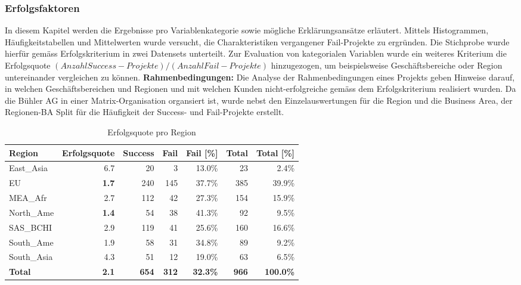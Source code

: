 \subsubsection{Erfolgsfaktoren}
In diesem Kapitel werden die Ergebnisse pro Variablenkategorie sowie mögliche Erklärungsansätze erläutert. Mittels Histogrammen, Häufigkeitstabellen und Mittelwerten wurde versucht, die Charakteristiken vergangener Fail-Projekte zu ergründen. Die Stichprobe wurde hierfür gemäss Erfolgskriterium in zwei Datensets unterteilt. Zur Evaluation von kategorialen Variablen wurde ein weiteres Kriterium die Erfolgsquote $(Anzahl Success-Projekte) / (Anzahl Fail-Projekte)$ hinzugezogen, um beispielsweise Geschäftsbereiche oder Region untereinander vergleichen zu können.
\newline\newline\textbf{Rahmenbedingungen:} Die Analyse der Rahmenbedingungen eines Projekts geben Hinweise darauf, in welchen Geschäftsbereichen und Regionen und mit welchen Kunden nicht-erfolgreiche gemäss dem Erfolgskriterium realisiert wurden. Da die Bühler AG in einer Matrix-Organisation organsiert ist, wurde nebst den Einzelauswertungen für die Region und die Business Area, der Regionen-BA Split für die Häufigkeit der Success- und Fail-Projekte erstellt.
\begin{table}[H]
	\centering
	\caption{Erfolgsquote pro Region}
	\begin{tabular}{lrrrrrr}
		\textbf{Region} & \multicolumn{1}{l}{\textbf{Erfolgsquote}} & \multicolumn{1}{l}{\textbf{Success}} & \multicolumn{1}{l}{\textbf{Fail}} & \multicolumn{1}{l}{\textbf{Fail [\%]}} & \multicolumn{1}{l}{\textbf{Total}} & \multicolumn{1}{l}{\textbf{Total [\%]}} \\ \hline
		East\_Asia & 6.7   & 20    & 3     & 13.0\% & 23    & 2.4\% \\
		EU    & \textbf{1.7}   & 240   & 145   & 37.7\% & 385   & 39.9\% \\
		MEA\_Afr & 2.7   & 112   & 42    & 27.3\% & 154   & 15.9\% \\
		North\_Ame & \textbf{1.4}   & 54    & 38    & 41.3\% & 92    & 9.5\% \\
		SAS\_BCHI & 2.9   & 119   & 41    & 25.6\% & 160   & 16.6\% \\
		South\_Ame & 1.9   & 58    & 31    & 34.8\% & 89    & 9.2\% \\
		South\_Asia & 4.3   & 51    & 12    & 19.0\% & 63    & 6.5\% \\ \hline
		\textbf{Total} & \textbf{2.1} & \textbf{654} & \textbf{312} & \textbf{32.3\%} & \textbf{966} & \textbf{100.0\%} \\
	\end{tabular}%
	\label{freg}%
\end{table}%
